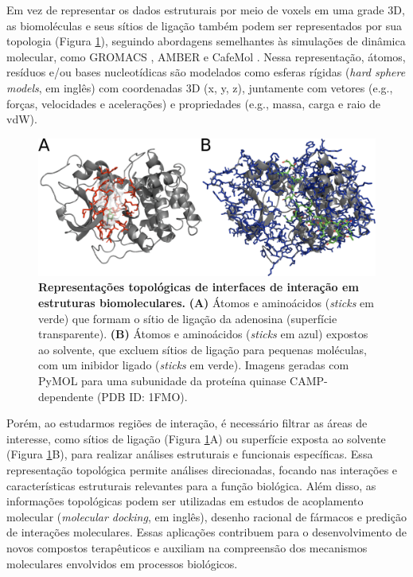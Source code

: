 \documentclass[Portugues]{phdquali}
\def\eg{e.g.\onedot}
\begin{document}
Em vez de representar os dados estruturais por meio de voxels em uma grade 3D, as biomoléculas e seus sítios de ligação também podem ser representados por sua topologia (Figura \ref{fig:topology-representation}), seguindo abordagens semelhantes às simulações de dinâmica molecular, como GROMACS \cite{gromacs}, AMBER \cite{amber} e CafeMol \cite{kenzaki2011}. Nessa representação, átomos, resíduos e/ou bases nucleotídicas são modelados como esferas rígidas (\textit{hard sphere models}, em inglês) com coordenadas 3D (x, y, z), juntamente com vetores (\eg, forças, velocidades e acelerações) e propriedades (\eg, massa, carga e raio de vdW).

\begin{figure}[ht]
  \centerline{\includegraphics[scale=2]{images/topology-representation.png}}
  \caption[Representações topológicas de interfaces de interação em estruturas biomoleculares]{\textbf{Representações topológicas de interfaces de interação em estruturas biomoleculares.} \textbf{(A)} Átomos e aminoácidos (\textit{sticks} em verde) que formam o sítio de ligação da adenosina (superfície transparente). \textbf{(B)} Átomos e aminoácidos (\textit{sticks} em azul) expostos ao solvente, que excluem sítios de ligação para pequenas moléculas, com um inibidor ligado (\textit{sticks} em verde). Imagens geradas com PyMOL para uma subunidade da proteína quinase CAMP-dependente (PDB ID: 1FMO).}
  \label{fig:topology-representation}
\end{figure}

Porém, ao estudarmos regiões de interação, é necessário filtrar as áreas de interesse, como sítios de ligação (Figura \ref{fig:topology-representation}A) ou superfície exposta ao solvente (Figura \ref{fig:topology-representation}B), para realizar análises estruturais e funcionais específicas. Essa representação topológica permite análises direcionadas, focando nas interações e características estruturais relevantes para a função biológica. Além disso, as informações topológicas podem ser utilizadas em estudos de acoplamento molecular (\textit{molecular docking}, em inglês), desenho racional de fármacos e predição de interações moleculares. Essas aplicações contribuem para o desenvolvimento de novos compostos terapêuticos e auxiliam na compreensão dos mecanismos moleculares envolvidos em processos biológicos.
\end{document}
